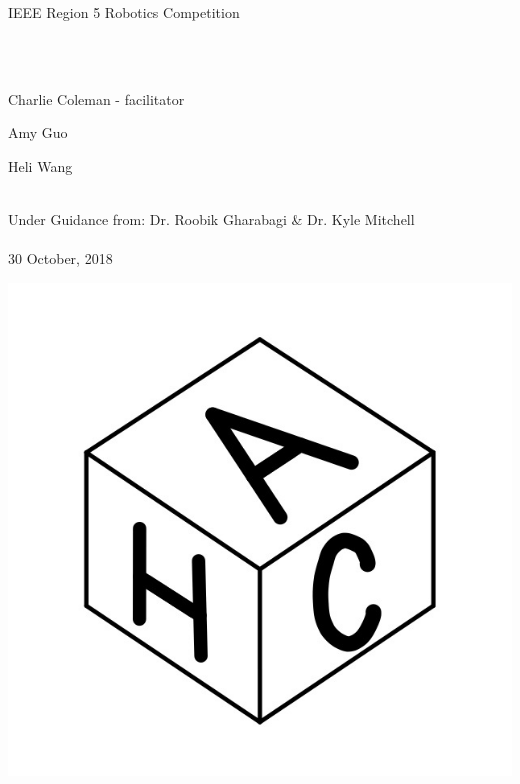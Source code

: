\documentclass[12pt]{article}
\begin{document}
	
\vspace*{\fill}
\begin{center}

\begin{LARGE}IEEE Region 5 Robotics Competition\end{LARGE}~\\~\\


\begin{large}
Charlie Coleman - facilitator 

Amy Guo

Heli Wang\\~\\
\end{large}

Under Guidance from: Dr. Roobik Gharabagi \& Dr. Kyle Mitchell\\~\\

30 October, 2018

\includegraphics[scale=0.3]{logo}


\end{center}
\vspace*{\fill}
\end{document}
